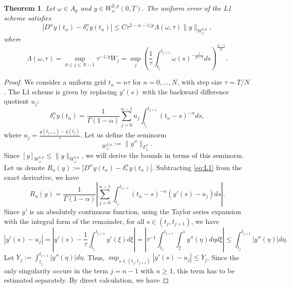 \documentclass[12pt,a4paper]{article}
\newtheorem{theorem}{Theorem}
\theoremstyle{definition}
\begin{document}
\begin{theorem}\label{th1}
Let $\omega \in A_p$ and $y \in W^{2,p}_\omega(0,T)$. The uniform error of the L1 scheme satisfies
\begin{equation}
    |D^\alpha y(t_n) - \delta_\tau^\alpha y(t_n)| \le C \tau^{2-\alpha-1/p} \Lambda(\omega, \tau) \|y\|_{W^{2,p}_\omega},
\end{equation}
where
\begin{equation}
    \Lambda(\omega, \tau) = \sup_{0 \le j \le N-1} \tau^{-1/q} W_j = \sup_{j} \left( \frac{1}{\tau} \int_{t_j}^{t_{j+1}} \omega(s)^{-\frac{1}{p-1}} ds \right)^{\frac{p-1}{p}}.
\end{equation}
\end{theorem}

\begin{proof}
We consider a uniform grid $t_n = n\tau$ for $n=0, \dots, N$, with step size $\tau = T/N$. The L1 scheme is given by replacing $y'(s)$ with the backward difference quotient $u_j$:
\begin{equation} \label{eq:L1}
    \delta_\tau^\alpha y(t_n) = \frac{1}{\Gamma(1-\alpha)} \sum_{j=0}^{n-1} u_j \int_{t_j}^{t_{j+1}} (t_n - s)^{-\alpha} ds,
\end{equation}
where $u_j = \frac{y(t_{j+1}) - y(t_j)}{\tau}$. Let us define the seminorm
\begin{equation}
    [y]_{W^{2,p}_\omega} := \|y''\|_{L^p_\omega}.
\end{equation}
Since $[y]_{W^{2,p}_\omega} \le \|y\|_{W^{2,p}_\omega}$, we will derive the bounds in terms of this seminorm. Let us denote $R_n(y) := |D^\alpha y(t_n) - \delta_\tau^\alpha y(t_n)|$. Subtracting \eqref{eq:L1} from the exact derivative, we have
\begin{equation} \label{eq:error_rep}
    R_n(y) = \frac{1}{\Gamma(1-\alpha)} \left|\sum_{j=0}^{n-1} \int_{t_j}^{t_{j+1}} (t_n - s)^{-\alpha} (y'(s) - u_j) ds \right|.
\end{equation}
Since $y'$ is an absolutely continuous function, using the Taylor series expansion with the integral form of the remainder, for all $s \in (t_j, t_{j+1})$, we have
\begin{equation}
    |y'(s) - u_j| = \left|y'(s) - \frac{1}{\tau}\int_{t_j}^{t_{j+1}} y'(\xi) d\xi\right| = \left|\tau^{-1} \int_{t_j}^{t_{j+1}} \int_{\xi}^s y''(\eta) d\eta d\xi\right| \le \int_{t_j}^{t_{j+1}} |y''(\eta)| d\eta.
\end{equation}
Let $Y_j := \int_{t_j}^{t_{j+1}} |y''(\eta)| d\eta$. Thus, $\sup_{s \in (t_j, t_{j+1})} |y'(s) - u_j| \le Y_j$. Since the only singularity occurs in the term $j = n - 1$ with $n \ge 1$, this term has to be estimated separately. By direct calculation, we have

\end{proof}
\end{document}
